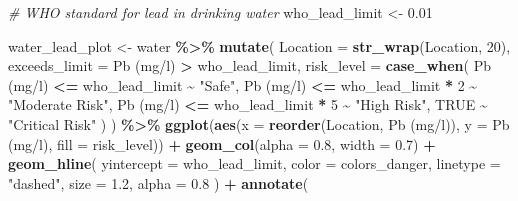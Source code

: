 \documentclass[
]{article}
\newenvironment{Shaded}{\begin{snugshade}}{\end{snugshade}}
\newcommand{\AttributeTok}[1]{\textcolor[rgb]{0.13,0.29,0.53}{#1}}
\newcommand{\CommentTok}[1]{\textcolor[rgb]{0.56,0.35,0.01}{\textit{#1}}}
\newcommand{\ConstantTok}[1]{\textcolor[rgb]{0.56,0.35,0.01}{#1}}
\newcommand{\DecValTok}[1]{\textcolor[rgb]{0.00,0.00,0.81}{#1}}
\newcommand{\FloatTok}[1]{\textcolor[rgb]{0.00,0.00,0.81}{#1}}
\newcommand{\FunctionTok}[1]{\textcolor[rgb]{0.13,0.29,0.53}{\textbf{#1}}}
\newcommand{\NormalTok}[1]{#1}
\newcommand{\OtherTok}[1]{\textcolor[rgb]{0.56,0.35,0.01}{#1}}
\newcommand{\SpecialCharTok}[1]{\textcolor[rgb]{0.81,0.36,0.00}{\textbf{#1}}}
\newcommand{\StringTok}[1]{\textcolor[rgb]{0.31,0.60,0.02}{#1}}
\begin{document}
\begin{Shaded}
\begin{Highlighting}[]
\CommentTok{\# WHO standard for lead in drinking water}
\NormalTok{who\_lead\_limit }\OtherTok{\textless{}{-}} \FloatTok{0.01}

\NormalTok{water\_lead\_plot }\OtherTok{\textless{}{-}}\NormalTok{ water }\SpecialCharTok{\%\textgreater{}\%}
  \FunctionTok{mutate}\NormalTok{(}
    \AttributeTok{Location =} \FunctionTok{str\_wrap}\NormalTok{(Location, }\DecValTok{20}\NormalTok{),}
    \AttributeTok{exceeds\_limit =} \StringTok{\textasciigrave{}}\AttributeTok{Pb (mg/l)}\StringTok{\textasciigrave{}} \SpecialCharTok{\textgreater{}}\NormalTok{ who\_lead\_limit,}
    \AttributeTok{risk\_level =} \FunctionTok{case\_when}\NormalTok{(}
      \StringTok{\textasciigrave{}}\AttributeTok{Pb (mg/l)}\StringTok{\textasciigrave{}} \SpecialCharTok{\textless{}=}\NormalTok{ who\_lead\_limit }\SpecialCharTok{\textasciitilde{}} \StringTok{"Safe"}\NormalTok{,}
      \StringTok{\textasciigrave{}}\AttributeTok{Pb (mg/l)}\StringTok{\textasciigrave{}} \SpecialCharTok{\textless{}=}\NormalTok{ who\_lead\_limit }\SpecialCharTok{*} \DecValTok{2} \SpecialCharTok{\textasciitilde{}} \StringTok{"Moderate Risk"}\NormalTok{,}
      \StringTok{\textasciigrave{}}\AttributeTok{Pb (mg/l)}\StringTok{\textasciigrave{}} \SpecialCharTok{\textless{}=}\NormalTok{ who\_lead\_limit }\SpecialCharTok{*} \DecValTok{5} \SpecialCharTok{\textasciitilde{}} \StringTok{"High Risk"}\NormalTok{,}
      \ConstantTok{TRUE} \SpecialCharTok{\textasciitilde{}} \StringTok{"Critical Risk"}
\NormalTok{    )}
\NormalTok{  ) }\SpecialCharTok{\%\textgreater{}\%}
  \FunctionTok{ggplot}\NormalTok{(}\FunctionTok{aes}\NormalTok{(}\AttributeTok{x =} \FunctionTok{reorder}\NormalTok{(Location, }\StringTok{\textasciigrave{}}\AttributeTok{Pb (mg/l)}\StringTok{\textasciigrave{}}\NormalTok{), }\AttributeTok{y =} \StringTok{\textasciigrave{}}\AttributeTok{Pb (mg/l)}\StringTok{\textasciigrave{}}\NormalTok{, }\AttributeTok{fill =}\NormalTok{ risk\_level)) }\SpecialCharTok{+}
  \FunctionTok{geom\_col}\NormalTok{(}\AttributeTok{alpha =} \FloatTok{0.8}\NormalTok{, }\AttributeTok{width =} \FloatTok{0.7}\NormalTok{) }\SpecialCharTok{+}
  \FunctionTok{geom\_hline}\NormalTok{(}
    \AttributeTok{yintercept =}\NormalTok{ who\_lead\_limit, }
    \AttributeTok{color =}\NormalTok{ colors\_danger, }
    \AttributeTok{linetype =} \StringTok{"dashed"}\NormalTok{, }
    \AttributeTok{size =} \FloatTok{1.2}\NormalTok{,}
    \AttributeTok{alpha =} \FloatTok{0.8}
\NormalTok{  ) }\SpecialCharTok{+}
  \FunctionTok{annotate}\NormalTok{(}

\end{Highlighting}
\end{Shaded}
\end{document}
